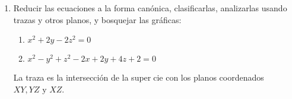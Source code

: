 \documentclass{article}
\begin{document}
\begin{enumerate}
{                \color{azul}
            }
            \item {
                Reducir las ecuaciones a la forma canónica, clasificarlas, analizarlas
                usando trazas y otros planos, y bosquejar las gráficas:
                \begin{enumerate}
                    \item{
                        $x^2+2y-2z^2=0$
                    }
                    \item{
                        $x^2-y^2+z^2-2x+2y+4z+2=0$
                    }
                \end{enumerate}
                La traza es la intersección de la supercie con los planos coordenados
                $XY,YZ \text{ y } XZ$.

                \color{azul}
            }
        \end{enumerate}
    
\end{document}

